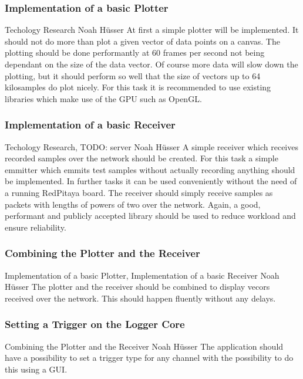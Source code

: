 \documentclass[a4paper,oneside]{alpenspecs/alpenspecs}
\begin{document}
\subsubsection{Implementation of a basic Plotter}
\label{subsec:frontend:}
\wpac
     {}
     {}
     {}
     {Techology Research}
     {}
     {Noah Hüsser}
     {%
         At first a simple plotter will be implemented. It should not do more than plot a given vector of data points on a canvas.
         The plotting should be done performantly at 60 frames per second not being dependant on the size of the data vector.
         Of course more data will slow down the plotting, but it should perform so well that the size of vectors up to 64 kilosamples do plot nicely.
         For this task it is recommended to use existing libraries which make use of the GPU such as OpenGL.
     }

\subsubsection{Implementation of a basic Receiver}
\label{subsec:frontend:}
\wpac
     {}
     {}
     {}
     {Techology Research, TODO: server}
     {}
     {Noah Hüsser}
     {%
         A simple receiver which receives recorded samples over the network should be created.
         For this task a simple emmitter which emmits test samples without actually recording anything should be implemented.
         In further tasks it can be used conveniently without the need of a running RedPitaya board.
         The receiver should simply receive samples as packets with lengths of powers of two over the network.
         Again, a good, performant and publicly accepted library should be used to reduce workload and ensure reliability.
     }

\subsubsection{Combining the Plotter and the Receiver}
\label{subsec:frontend:}
\wpac
     {}
     {}
     {}
     {Implementation of a basic Plotter, Implementation of a basic Receiver}
     {}
     {Noah Hüsser}
     {%
         The plotter and the receiver should be combined to display vecors received over the network.
         This should happen fluently without any delays.
     }

\subsubsection{Setting a Trigger on the Logger Core}
\label{subsec:frontend:}
\wpac
     {}
     {}
     {}
     {Combining the Plotter and the Receiver}
     {}
     {Noah Hüsser}
     {%
         The application should have a possibility to set a trigger type for any channel with the possibility to do this using a GUI.
     }
\end{document}
